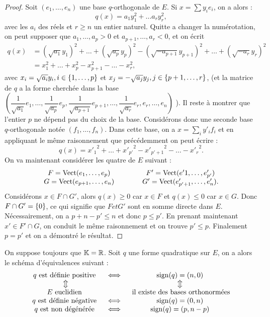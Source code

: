 \begin{proof}
Soit $(e_1, \dots, e_n)$ une base $q$-orthogonale de $E$. Si $x = \sum y_i e_i$, on a alors :
\[ q(x) = a_1 y_1^2 + \dots a_r y_r^2 , \]
avec les $a_i$ des réels et $r \geq n$ un entier naturel.
Quitte a changer la numérotation, on peut supposer que $a_1, \dots, a_p >0$ et $a_{p+1}, \dots, a_r < 0$, et on écrit
\begin{align*}
q(x) & = (\sqrt{a_1} y_1)^2 + \dots + (\sqrt{a_p} y_p)^2 - (\sqrt{-a_{p+1}} y_{p+1})^2 + \dots + (\sqrt{-a_r} y_r)^2 \\
& = x_1^2 + \dots + x_p^2 - x_{p+1}^2 - \dots - x_r^2 , 
\end{align*}
avec $x_i = \sqrt{a_i} y_i, i \in \{ 1, \dots, p \}$ et $x_j = -\sqrt{a_j} y_j, j \in \{ p+1, \dots, r \}$,
(et la matrice de $q$ a la forme cherchée dans la base 
$\left ( \dfrac1{\sqrt{a_1}} e_1, \dots, \dfrac1{\sqrt{a_p}} e_p, \dfrac1{\sqrt{a_{p+1}}} e_{p+1}, \dots, \dfrac1{\sqrt{a_{r}}} e_{r}, e_r, \dots, e_n
\right )$ ).
Il reste à montrer que l'entier $p$ ne dépend pas du choix de la base.
Considérons donc une seconde base $q$-orthogonale notée $(f_1, \dots, f_n)$.
Dans cette base, on a $x=\sum_i y'_i f_i$ et en appliquant le même raisonnement que précédemment on peut écrire :
\[ q(x) =  {x'_1}^2 + \dots + {x'_{p'}}^2 - {x'_{p'+1}}^2 - \dots - {x'_r}^2 . \]
On va maintenant considérer les quatre \sev de $E$ suivant :
\[ \begin{matrix}
F = \operatorname{Vect}(e_1, \dots, e_p) & \qquad & F' = \operatorname{Vect}(e'1, \dots, e'_{p'}) \\
G = \operatorname{Vect}(e_{p+1}, \dots, e_n) & \qquad & G' = \operatorname{Vect}(e'_{p'+1}, \dots, e'_n) . 
\end{matrix} \]
Considérons $x \in F \cap G'$, alors $q(x) \geq 0$ car $x \in F$ et $q(x) \leq 0$ car $x \in G$.
Donc $F \cap G' = \{ 0 \}$, ce qui signifie que $F et G'$ sont en somme directe dans $E$.
Nécessairement, on a $p+n-p' \leq n$ et donc $p \leq p'$.
En prenant maintenant $x' \in F' \cap G$, on conduit le même raisonnement et on trouve $p' \leq p$.
Finalement $p=p'$ et on a démontré le résultat.
\end{proof}

\begin{coro}
On suppose toujours que $\mathbb{K} = \mathbb{R}$. Soit $q$ une forme quadratique sur $E$, on a alors le schéma d'équivalences suivant :
\[ \begin{matrix}
q \text{ est définie positive } & \iff & \operatorname{sign}(q) = (n,0) \\
\big\Updownarrow & & \big\Updownarrow \\
E \text{ euclidien } & & \text{ il existe des bases orthonormées} \\
q \text{ est définie négative } & \iff & \operatorname{sign}(q) = (0,n) \\
q \text{ est non dégénérée } & \iff & \operatorname{sign}(q) = (p,n-p) \\
\end{matrix} \]
\end{coro}


